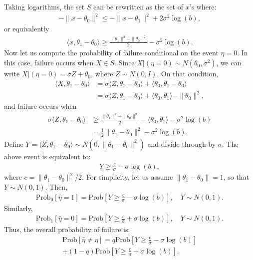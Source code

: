 \documentclass[9pt,twocolumn,twoside,lineno]{pnas-new}
\renewcommand{\P}{\mathrm{Prob}}
\begin{document}
Taking logarithms, the set $S$ can be rewritten as the set of $x$'s where:
\begin{align*}
%
-\| x - \theta_0\|^2 \le - \|x - \theta_1\|^2 + 2 \sigma^2 \log(b),
%
\end{align*}
%
or equivalently
%
\begin{align*}
%
\langle x , \theta_1 - \theta_0 \rangle 
\ge \frac{\|\theta_1\|^2 - \|\theta_0\|^2}{2} - \sigma^2 \log(b).
%
\end{align*}
%
Now let us compute the probability of failure conditional on the event $\eta = 0$. In this case, failure occurs when $X \in S$. Since $X|(\eta=0) \sim N(\theta_0,\sigma^2)$, we can write $X | (\eta=0) = \sigma Z + \theta_0$, where $Z \sim N(0,I)$. On that condition,
%
\begin{align*}
%
\langle X , \theta_1 - \theta_0 \rangle 
&= \sigma \langle Z , \theta_1 - \theta_0 \rangle 
+ \langle \theta_0,\theta_1 - \theta_0 \rangle
\nonumber \\
&= \sigma \langle Z , \theta_1 - \theta_0 \rangle 
+ \langle \theta_0,\theta_1 \rangle - \|\theta_0\|^2,
%
\end{align*}
%
and failure occurs when 
%
\begin{align*}
%
\sigma\langle Z, \theta_1 - \theta_0 \rangle 
&\ge \frac{\|\theta_1\|^2 + \|\theta_0\|^2}{2} - \langle \theta_0,\theta_1 \rangle
- \sigma^2 \log(b)
\nonumber \\
&= \frac{1}{2} \|\theta_1 - \theta_0\|^2 - \sigma^2 \log(b).
%
\end{align*}
%
Define $Y = \langle Z , \theta_1 - \theta_0 \rangle \sim N(0,\|\theta_1 - \theta_0\|^2)$ and divide through by $\sigma$. The above event is equivalent to:
%
\begin{align*}
%
Y \ge \frac{c}{\sigma} - \sigma \log(b),
%
\end{align*}
%
where $c = \|\theta_1 - \theta_0\|^2 / 2$. 
For simplicity, let us assume $\| \theta_1 - \theta_0\| = 1$, so that $Y \sim N(0,1)$. Then, 
%
\begin{align*}
%
\P_0[\hat{\eta} = 1] = \P\left[Y \ge \frac{c}{\sigma} - \sigma \log(b) \right],
\quad Y \sim N(0,1).
%
\end{align*}
%
Similarly,
%
\begin{align*}
%
\P_1[\hat{\eta} = 0] = \P\left[Y \ge \frac{c}{\sigma} + \sigma \log(b) \right],
\quad Y \sim N(0,1).
%
\end{align*}
%
Thus, the overall probability of failure is:
%
\begin{multline*}
%
\P[\hat{\eta} \ne \eta] = q \P\left[Y \ge \frac{c}{\sigma} - \sigma \log(b) \right] \\
+ (1-q) \P\left[Y \ge \frac{c}{\sigma} + \sigma \log(b) \right].
\end{multline*}
\end{document}
